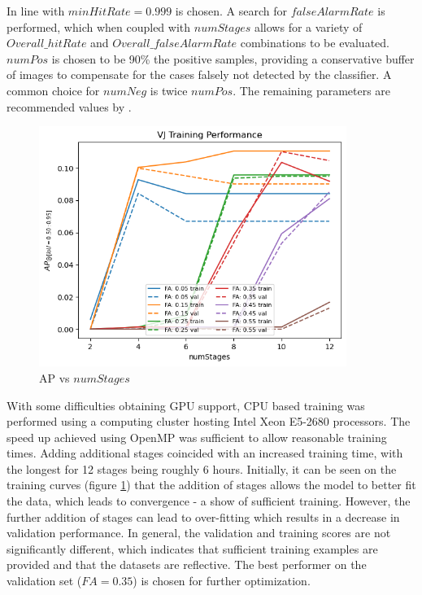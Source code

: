 \documentclass[a4paper,twoside,12pt]{report}
\begin{document}
In line with \cite{robovj} $minHitRate = 0.999$ is chosen. A search for $falseAlarmRate$ is performed, which when coupled with $numStages$ allows for a variety of $Overall\_hitRate$ and $Overall\_falseAlarmRate$ combinations to be evaluated. $numPos$ is chosen to be 90\% the positive samples, providing a conservative buffer of images to compensate for the cases falsely not detected by the classifier. A common choice for $numNeg$ is twice $numPos$. The remaining parameters are recommended values by \cite{vjdataset}.

\begin{figure}[h!]
\begin{center}
\includegraphics[width=10cm]{images/vj_training.png}
\caption{AP vs $numStages$}
\label{fig:vjstages}
\end{center}
\end{figure}

With some difficulties obtaining GPU support, CPU based training was performed using a computing cluster hosting Intel Xeon E5-2680 processors. The speed up achieved using OpenMP was sufficient to allow reasonable training times. Adding additional stages coincided with an increased training time, with the longest for 12 stages being roughly 6 hours. Initially, it can be seen on the training curves (figure \ref{fig:vjstages}) that the addition of stages allows the model to better fit the data, which leads to convergence - a show of sufficient training. However, the further addition of stages can lead to over-fitting which results in a decrease in validation performance. In general, the validation and training scores are not significantly different, which indicates that sufficient training examples are provided and that the datasets are reflective. The best performer on the validation set ($FA=0.35$) is chosen for further optimization.
\end{document}
